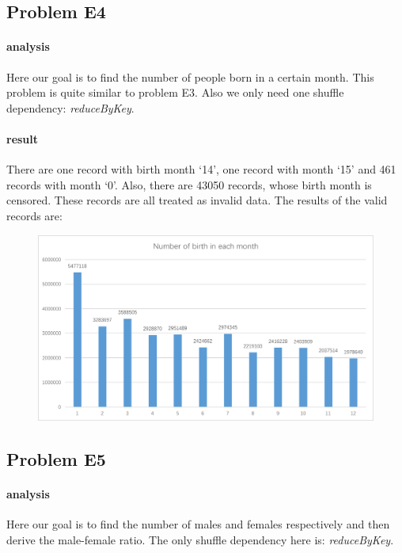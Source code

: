 \documentclass{article}
\begin{document}
\subsection{Problem E4}
\paragraph{analysis}
Here our goal is to find the number of people born in a certain month. This problem is quite similar to problem E3. Also we only need one shuffle dependency: \emph{reduceByKey}.

\paragraph{result}
There are one record with birth month `14', one record with month `15' and 461 records with month `0'. Also, there are 43050 records, whose birth month is censored. These records are all treated as invalid data. The results of the valid records are:
\begin{figure}[ht]
\centering
\includegraphics[width=0.7\linewidth]{E4}
\end{figure}


\subsection{Problem E5}
\paragraph{analysis}
Here our goal is to find the number of males and females respectively and then derive the male-female ratio. The only shuffle dependency here is: \emph{reduceByKey}.
\end{document}
